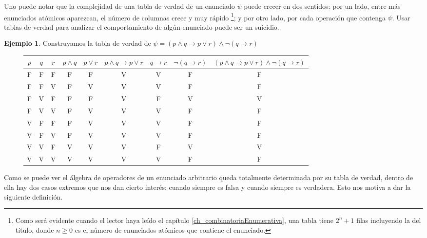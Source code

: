 \documentclass{book}
\theoremstyle{definition}
\newtheorem{ejm}{Ejemplo}[chapter]
\begin{document}
Uno puede notar que la complejidad de una tabla de verdad de un enunciado $\psi$ puede crecer en dos sentidos: por un lado, entre más enunciados atómicos aparezcan, el número de columnas crece y muy rápido
	\footnote{Como será evidente cuando el lector haya leído el capítulo \ref{ch_combinatoriaEnumerativa}, una tabla tiene $2^n+1$ filas incluyendo la del título, donde $n\geq 0$ es el número de enunciados atómicos que contiene el enunciado.};
y por otro lado, por cada operación que contenga $\psi$.
Usar tablas de verdad para analizar el comportamiento de algún enunciado puede ser un suicidio.
\begin{ejm}
	Construyamos la tabla de verdad de $\psi = \left(p \wedge q \rightarrow p \vee r \right)\wedge \neg \left(q \rightarrow r\right)$
	
	\begin{figure}[h]
	\begin{center}\begin{tabular}{|c|c|c||c|c|c|c|c|c|}
			\hline 
			$p$& $q$ & $r$ & $p \wedge q $ & $p \vee r$ & $p \wedge q  \rightarrow p \vee r $ & $q \rightarrow r$ & $\neg\left(q \rightarrow r\right)$ & $\left(p \wedge q \rightarrow p \vee r \right)\wedge \neg \left(q \rightarrow r\right)$ 
			\\
			\hline \hline
			F & F & F & F & F & V & V & F & F \\
			\hline
			F & F & V & F & V & V & V & F & F \\
			\hline
			F & V & F & F & F & V & F & V & V \\
			\hline
			F & V & V & F & V & V & V & F & F \\
			\hline
			V & F & F & F & V & V & V & F & F \\
			\hline
			V & F & V & F & V & V & V & F & F \\
			\hline
			V & V & F & V & V & V & F & V & V \\
			\hline
			V & V & V & V & V & V & V & F & F \\
			\hline
\end{tabular}\end{center}\end{figure}
\end{ejm}

Como se puede ver el álgebra de operadores de un enunciado arbitrario queda totalmente determinada por su tabla de verdad, dentro de ella hay dos casos extremos que nos dan cierto interés: cuando siempre es falsa y cuando siempre es verdadera. Esto nos motiva a dar la siguiente definición.
\end{document}
